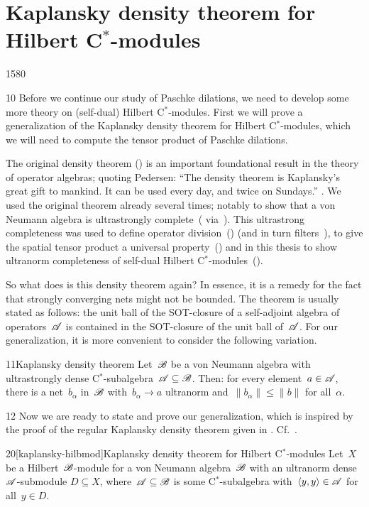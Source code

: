 \section{Kaplansky density theorem for Hilbert C$^*$-modules}
\begin{parsec}{1580}%
\begin{point}{10}%
Before we continue our study of Paschke dilations,
    we need to develop some more theory on (self-dual) Hilbert C$^*$-modules.
First we will prove a generalization of the Kaplansky density
    theorem for Hilbert C$^*$-modules,
    which we will need to compute the tensor product of Paschke dilations.

The original density theorem ()
    is an important foundational result
    in the theory of operator algebras;
    quoting Pedersen:
    ``The density theorem is Kaplansky's great gift to mankind.
    It can be used every day, and twice on
    Sundays.'' \cite[\S2.3.4]{pedersen1979c}.
We used the original theorem already several times;
    notably to show that
        a von Neumann algebra is
        ultrastrongly complete~(
        via~).
This ultrastrong completeness was used
    to define operator division~()
        (and in turn filters~),
        to give the spatial tensor product a universal
        property~()
    and in this thesis to show ultranorm completeness
        of self-dual Hilbert C$^*$-modules~().

So what does is this density theorem again?
In essence, it is a remedy for the fact
    that strongly converging nets might not be bounded.
The theorem is usually stated as follows:
    the unit ball of the SOT-closure of a self-adjoint algebra
    of operators~$\mathscr{A}$
    is contained in the SOT-closure of the unit ball of~$\mathscr{A}$.
For our generalization, it is more convenient to consider the following
    variation.
\end{point}
\begin{point}{11}{Kaplansky density theorem}%
Let~$\mathscr{B}$ be a von Neumann algebra with ultrastrongly dense
    C$^*$-subalgebra~$\mathscr{A}  \subseteq \mathscr{B}$.
Then: for every element~$a \in \mathscr{A}$,
    there is a net~$b_\alpha$ in~$\mathscr{B}$
    with~$b_\alpha \to a$ ultranorm
    and~$\|b_\alpha\| \leq \|b\|$ for all~$\alpha$.
\end{point}
\begin{point}{12}%
Now we are ready to state and prove our generalization,
    which is inspired by the proof of the regular Kaplansky density theorem
    given in \cite[Thm.~1.2.2]{arveson2012invitation}.
Cf.~.
\end{point}
\begin{point}{20}[kaplansky-hilbmod]{Kaplansky density theorem for Hilbert C$^*$-modules}%
Let~$X$ be a Hilbert~$\mathscr{B}$-module for a von Neumann algebra~$\mathscr{B}$
    with an ultranorm dense $\mathscr{A}$-submodule $D \subseteq X$,
    where~$\mathscr{A} \subseteq \mathscr{B}$ is some C$^*$-subalgebra
    with~$\langle y,y \rangle \in \mathscr{A}$ for all~$y \in D$.


\end{point}
\end{parsec}
